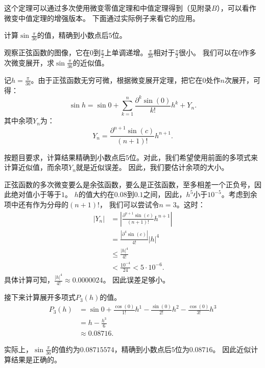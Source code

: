 \documentclass[12pt,UTF8]{ctexbook}
\begin{document}
这个定理可以通过多次使用微变零值定理和中值定理得到（见附录$B$），可以看作微变中值定理的增强版本。
下面通过实际例子来看它的应用。

\begin{et}
    计算$\sin{\frac{\pi}{36}}$的值，精确到小数点后$5$位。
\end{et}

\begin{so}
    观察正弦函数的图像，它在$0$到$\frac{\pi}{2}$上单调递增。$\frac{\pi}{36}$相对于$\frac{\pi}{2}$很小。
    我们可以在$0$作多次微变展开，求$\sin{\frac{\pi}{36}}$的近似值。

    记$h = \frac{\pi}{36}$。由于正弦函数无穷可微，根据微变展开定理，把它在$0$处作$n$次展开，可得：
    $$ \sin{h} = \sin{0} + \sum_{k=1}^n \frac{\partial^k \sin (0)}{k!}h^k + Y_n. $$
    其中余项$Y_n$为：
    $$ Y_n = \frac{\partial^{n+1} \sin (c)}{(n+1)!}h^{n+1}. $$

    按题目要求，计算结果精确到小数点后$5$位。对此，我们希望使用前面的多项式来计算近似值，而余项$Y_n$就是近似误差。
    因此，我们要估计余项的大小。
    
    正弦函数的多次微变要么是余弦函数，要么是正弦函数，至多相差一个正负号，因此绝对值小于等于$1$。
    $h$的值大约在$0.08$到$0.1$之间，因此，$h^5$小于$10^{-5}$。考虑到余项中还有作为分母的$(n+1)!$，
    我们可以尝试令$n=3$。这时：
    \begin{align*}
        | Y_n| &= \left|\frac{\partial^{n+1} \sin (c)}{(n+1)!}h^{n+1}\right|  \\
        &= \frac{\left|\partial^{4} \sin (c)\right|}{4!}|h|^4  \\
        &\leqslant \frac{|h|^4}{4!}  \\
        &< \frac{10^{-4}}{24} < 5 \cdot 10^{-6}. 
    \end{align*}
    具体计算可知，$\frac{|h|^4}{4!} \approx 0.0000024$。
    因此误差足够小。


    接下来计算展开多项式$P_3(h)$的值。
    \begin{align*}
        P_3(h) &= \sin{0} + \frac{\cos (0)}{1!}h^1 - \frac{\sin (0)}{2!}h^2 - \frac{\cos (0)}{3!}h^3  \\
        &= h - \frac{h^3}{6}  \\
        &\approx 0.08716. 
    \end{align*}
    
    实际上，$\sin{\frac{\pi}{36}}$的值约为$0.08715574$，精确到小数点后$5$位为$0.08716$。
    因此近似计算结果是正确的。
\end{so}
\end{document}
